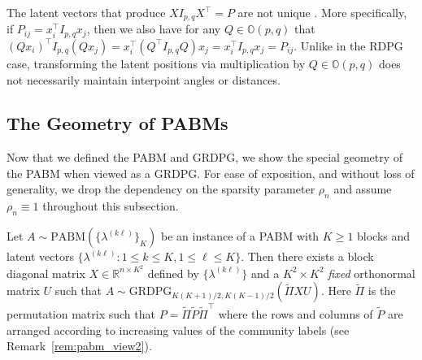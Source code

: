 \documentclass[12pt]{article}
\begin{document}
\begin{remark}
  \label{rem:non_identifiable}
The latent vectors that produce $X I_{p,q} X^\top = P$ are not unique
\citep{rubindelanchy2017statistical}.
More specifically, if $P_{ij} = x_i^\top I_{p, q} x_j$, 
then we also have for any $Q \in \mathbb{O}(p, q)$ that
$(Q x_i)^\top I_{p, q} (Q x_j) = x_i^\top (Q^\top I_{p, q} Q) x_j =
x_i^\top I_{p, q} x_j = P_{ij}$.
Unlike in the RDPG case, transforming the latent positions via multiplication
by $Q \in \mathbb{O}(p, q)$ does not necessarily maintain interpoint angles or
distances.
\end{remark}

\hypertarget{connecting-the-pabm-to-the-grdpg}{%
\subsection{The Geometry of PABMs}\label{connecting-the-pabm-to-the-grdpg}}
Now that we defined the PABM and GRDPG, 
we show the special geometry of the PABM when viewed as a GRDPG. For
ease of exposition, and without loss of generality, we drop the
dependency on the sparsity parameter $\rho_n$ 
and assume $\rho_n \equiv 1$ throughout this subsection. 
\begin{theorem}
\label{theorem2}
Let $A \sim \mathrm{PABM}(\{\lambda^{(k \ell)}\}_K)$ be an instance of a
PABM with $K \geq 1$ blocks and latent vectors $\{\lambda^{(k \ell)}
\colon 1 \leq k \leq K, 1 \leq \ell \leq K\}$. 
Then there exists a block diagonal matrix
$X \in \mathbb{R}^{n \times K^2}$ defined by $\{\lambda^{(k \ell)}\}$ and a 
$K^2 \times K^2$ {\em fixed} orthonormal matrix $U$ such 
that $A \sim \mathrm{GRDPG}_{K (K+1) / 2, K (K-1) /
  2}(\tilde{\Pi}XU)$. Here $\tilde{\Pi}$ is the permutation matrix
such that $P = \tilde{\Pi} \tilde{P} \tilde{\Pi}^{\top}$ where the
rows and columns of $\tilde{P}$ are arranged according to increasing values of the
community labels (see Remark~\ref{rem:pabm_view2}). 
\end{theorem}
\end{document}

